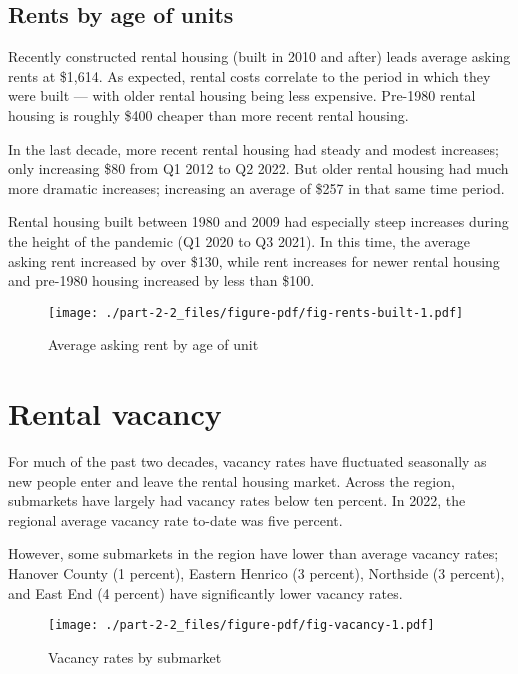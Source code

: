 \documentclass[
  letterpaper,
  DIV=11,
  numbers=noendperiod]{scrreprt}
\begin{document}
\hypertarget{rents-by-age-of-units}{%
\subsection{Rents by age of units}\label{rents-by-age-of-units}}

Recently constructed rental housing (built in 2010 and after) leads
average asking rents at \$1,614. As expected, rental costs correlate to
the period in which they were built --- with older rental housing being
less expensive. Pre-1980 rental housing is roughly \$400 cheaper than
more recent rental housing.

In the last decade, more recent rental housing had steady and modest
increases; only increasing \$80 from Q1 2012 to Q2 2022. But older
rental housing had much more dramatic increases; increasing an average
of \$257 in that same time period.

Rental housing built between 1980 and 2009 had especially steep
increases during the height of the pandemic (Q1 2020 to Q3 2021). In
this time, the average asking rent increased by over \$130, while rent
increases for newer rental housing and pre-1980 housing increased by
less than \$100.

\begin{figure}

{\centering \texttt{[image: ./part-2-2\_files/figure-pdf/fig-rents-built-1.pdf]}

}

\caption{\label{fig-rents-built}Average asking rent by age of unit}

\end{figure}

\hypertarget{rental-vacancy}{%
\section{Rental vacancy}\label{rental-vacancy}}

For much of the past two decades, vacancy rates have fluctuated
seasonally as new people enter and leave the rental housing market.
Across the region, submarkets have largely had vacancy rates below ten
percent. In 2022, the regional average vacancy rate to-date was five
percent.

However, some submarkets in the region have lower than average vacancy
rates; Hanover County (1 percent), Eastern Henrico (3 percent),
Northside (3 percent), and East End (4 percent) have significantly lower
vacancy rates.

\begin{figure}

{\centering \texttt{[image: ./part-2-2\_files/figure-pdf/fig-vacancy-1.pdf]}

}

\caption{\label{fig-vacancy}Vacancy rates by submarket}

\end{figure}
\end{document}
